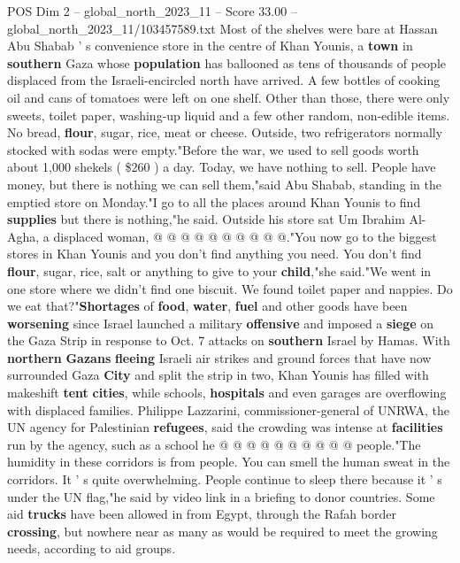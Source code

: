 \begin{textsample}{POS Dim 2 – global\_north\_2023\_11 – Score 33.00 – global\_north\_2023\_11/103457589.txt}  \label{ex:f2_pos_231}
Most of the shelves were bare at Hassan Abu Shabab ' s convenience store in the centre of Khan Younis, a \textbf{town} in \textbf{southern} Gaza whose \textbf{population} has ballooned as tens of thousands of people displaced from the Israeli-encircled north have arrived.
A few bottles of cooking oil and cans of tomatoes were left on one shelf.
Other than those, there were only sweets, toilet paper, washing-up liquid and a few other random, non-edible items.
No bread, \textbf{flour}, sugar, rice, meat or cheese.
Outside, two refrigerators normally stocked with sodas were empty."Before the war, we used to sell goods worth about 1,000 shekels ( \$260 ) a day.
Today, we have nothing to sell.
People have money, but there is nothing we can sell them,"said Abu Shabab, standing in the emptied store on Monday."I go to all the places around Khan Younis to find \textbf{supplies} but there is nothing,"he said.
Outside his store sat Um Ibrahim Al-Agha, a displaced woman, @ @ @ @ @ @ @ @ @ @."You now go to the biggest stores in Khan Younis and you don't find anything you need.
You don't find \textbf{flour}, sugar, rice, salt or anything to give to your \textbf{child},"she said."We went in one store where we didn't find one biscuit.
We found toilet paper and nappies.
Do we eat that?"\textbf{Shortages} of \textbf{food}, \textbf{water}, \textbf{fuel} and other goods have been \textbf{worsening} since Israel launched a military \textbf{offensive} and imposed a \textbf{siege} on the Gaza Strip in response to Oct. 7 attacks on \textbf{southern} Israel by Hamas.
With \textbf{northern} \textbf{Gazans} \textbf{fleeing} Israeli air strikes and ground forces that have now surrounded Gaza \textbf{City} and split the strip in two, Khan Younis has filled with makeshift \textbf{tent} \textbf{cities}, while schools, \textbf{hospitals} and even garages are overflowing with displaced families.
Philippe Lazzarini, commissioner-general of UNRWA, the UN agency for Palestinian \textbf{refugees}, said the crowding was intense at \textbf{facilities} run by the agency, such as a school he @ @ @ @ @ @ @ @ @ @ people."The humidity in these corridors is from people.
You can smell the human sweat in the corridors.
It ' s quite overwhelming.
People continue to sleep there because it ' s under the UN flag,"he said by video link in a briefing to donor countries.
Some aid \textbf{trucks} have been allowed in from Egypt, through the Rafah border \textbf{crossing}, but nowhere near as many as would be required to meet the growing needs, according to aid groups.

\end{textsample}
